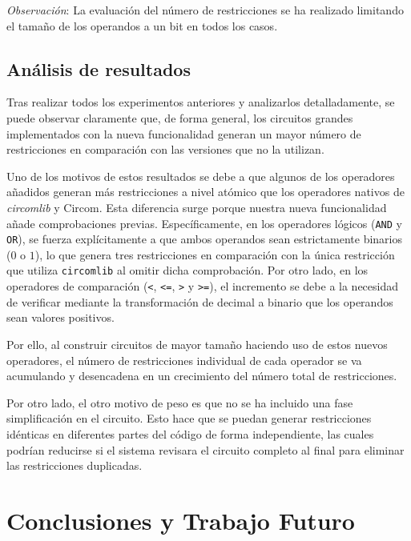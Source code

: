 \documentclass[a4paper,12pt]{report}
\begin{document}
	\vspace{0.3cm}
	\noindent \textit{Observación}: La evaluación del número de restricciones se ha realizado limitando el tamaño de los operandos a un bit en todos los casos.
	
	
	\section{Análisis de resultados}
	\label{s:analisis-resultados}
	\vspace{0.2cm}
	\noindent Tras realizar todos los experimentos anteriores y analizarlos detalladamente, se puede observar claramente que, de forma general, los circuitos grandes implementados con la nueva funcionalidad generan un mayor número de restricciones en comparación con las versiones que no la utilizan.
	
	\vspace{0.2cm}
	\noindent Uno de los motivos de estos resultados se debe a que algunos de los operadores añadidos generan más restricciones a nivel atómico que los operadores nativos de \textit{circomlib} y Circom. Esta diferencia surge porque nuestra nueva funcionalidad añade comprobaciones previas. Específicamente, en los operadores lógicos (\texttt{AND} y \texttt{OR}), se fuerza explícitamente a que ambos operandos sean estrictamente binarios ($0$ o $1$), lo que genera tres restricciones en comparación con la única restricción que utiliza \texttt{circomlib} al omitir dicha comprobación. Por otro lado, en los operadores de comparación (\texttt{<}, \texttt{<=}, \texttt{>} y \texttt{>=}), el incremento se debe a la necesidad de verificar mediante la transformación de decimal a binario que los operandos sean valores positivos.
	
	\vspace{0.2cm}
	\noindent Por ello, al construir circuitos de mayor tamaño haciendo uso de estos nuevos operadores, el número de restricciones individual de cada operador se va acumulando y desencadena en un crecimiento del número total de restricciones.
	
	\vspace{0.2cm}
	\noindent Por otro lado, el otro motivo de peso es que no se ha incluido una fase simplificación en el circuito. Esto hace que se puedan generar restricciones idénticas en diferentes partes del código de forma independiente, las cuales podrían reducirse si el sistema revisara el circuito completo al final para eliminar las restricciones duplicadas.
	
	\chapter{Conclusiones y Trabajo Futuro}
\end{document}
